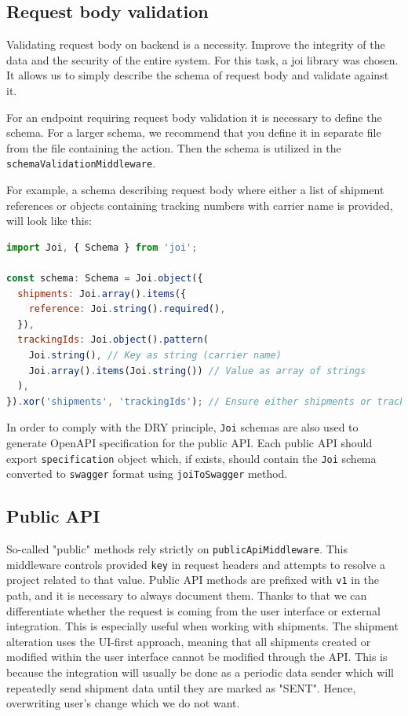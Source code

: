 \subsection{Request body validation}
Validating request body on backend is a necessity.
Improve the integrity of the data and the security of the entire system.
For this task, a \gls{joi} library was chosen.
It allows us to simply describe the schema of request body and validate against it.

For an endpoint requiring request body validation it is necessary to define the schema.
For a larger schema, we recommend that you define it in separate file from the file containing the action. 
Then the schema is utilized in the \texttt{schemaValidationMiddleware}.

For example, a schema describing request body where either a list of shipment references or objects containing tracking numbers with carrier name is provided, will look like this:

\begin{lstlisting}[language=JavaScript,caption={Joi schema example}]
import Joi, { Schema } from 'joi';

const schema: Schema = Joi.object({
  shipments: Joi.array().items({
    reference: Joi.string().required(),
  }),
  trackingIds: Joi.object().pattern(
    Joi.string(), // Key as string (carrier name)
    Joi.array().items(Joi.string()) // Value as array of strings
  ),
}).xor('shipments', 'trackingIds'); // Ensure either shipments or trackingIds is provided, but not both
\end{lstlisting}

In order to comply with the DRY principle, \texttt{Joi} schemas are also used to generate OpenAPI specification for the public API.
Each public API should export \texttt{specification} object which, if exists, should contain the \texttt{Joi} schema converted to \texttt{swagger} format using \texttt{joiToSwagger} method.

\subsection{Public API}
So-called "public" methods rely strictly on \texttt{publicApiMiddleware}.
This middleware controls provided \texttt{key} in request headers and attempts to resolve a project related to that value. 
Public API methods are prefixed with \texttt{v1} in the path, and it is necessary to always document them.
Thanks to that we can differentiate whether the request is coming from the user interface or external integration.
This is especially useful when working with shipments.
The shipment alteration uses the UI-first approach, meaning that all shipments created or modified within the user interface cannot be modified through the API.
This is because the integration will usually be done as a periodic data sender which will repeatedly send shipment data until they are marked as "SENT". 
Hence, overwriting user's change which we do not want.


